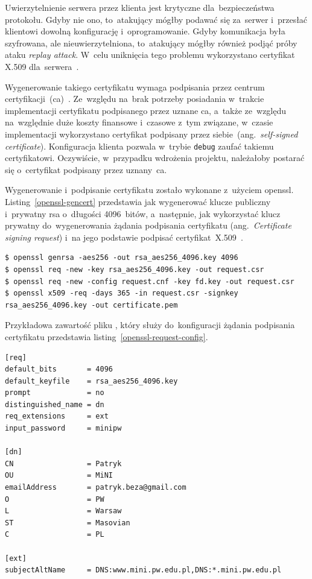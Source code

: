 \documentclass[thesis]{subfiles}
\begin{document}
Uwierzytelnienie serwera przez klienta jest krytyczne dla~bezpieczeństwa protokołu. Gdyby nie ono, to~atakujący mógłby podawać się za~serwer i~przesłać klientowi dowolną konfigurację i~oprogramowanie. Gdyby komunikacja była szyfrowana, ale nieuwierzytelniona, to~atakujący mógłby również podjąć próby ataku \emph{replay attack}. W~celu uniknięcia tego problemu wykorzystano certyfikat X.509 dla~serwera~\cite{wiki:x509}.

Wygenerowanie takiego certyfikatu wymaga podpisania przez centrum certyfikacji~(\gls{ca})~\cite{wiki:ca}. Ze~względu na~brak potrzeby posiadania w~trakcie implementacji certyfikatu podpisanego przez uznane \gls{ca}, a~także ze~względu na~względnie duże koszty finansowe i~czasowe z~tym związane, w~czasie implementacji wykorzystano certyfikat podpisany przez siebie~(ang.~\emph{self-signed certificate}). Konfiguracja klienta pozwala w~trybie \texttt{debug} zaufać takiemu certyfikatowi. Oczywiście, w~przypadku wdrożenia projektu, należałoby postarać się o~certyfikat podpisany przez uznany~\gls{ca}.

Wygenerowanie i~podpisanie certyfikatu zostało wykonane z~użyciem \gls{openssl}. Listing~\ref{openssl-gencert} przedstawia jak wygenerować klucze publiczny i~prywatny \gls{rsa} o~długości 4096~bitów, a~następnie, jak wykorzystać klucz prywatny do~wygenerowania żądania podpisania certyfikatu (ang.~\emph{Certificate signing request}) i~na jego podstawie podpisać certyfikat~X.509~\cite{openssl-cookbook,wiki:csr}.

\begin{lstlisting}[numbers=none,caption={Wygenerowanie i~podpisanie certyfikatu X.509},label=openssl-gencert]
$ openssl genrsa -aes256 -out rsa_aes256_4096.key 4096
$ openssl req -new -key rsa_aes256_4096.key -out request.csr
$ openssl req -new -config request.cnf -key fd.key -out request.csr
$ openssl x509 -req -days 365 -in request.csr -signkey rsa_aes256_4096.key -out certificate.pem
\end{lstlisting}

Przykładowa zawartość pliku , który służy do~konfiguracji żądania podpisania certyfikatu przedstawia listing~\ref{openssl-request-config}.

\begin{lstlisting}[numbers=none,caption={Plik z~konfiguracją certyfikatu X.509},label=openssl-request-config]
[req]
default_bits       = 4096
default_keyfile    = rsa_aes256_4096.key
prompt             = no
distinguished_name = dn
req_extensions     = ext
input_password     = minipw

[dn]
CN                 = Patryk
OU                 = MiNI
emailAddress       = patryk.beza@gmail.com
O                  = PW
L                  = Warsaw
ST                 = Masovian
C                  = PL

[ext]
subjectAltName     = DNS:www.mini.pw.edu.pl,DNS:*.mini.pw.edu.pl
\end{lstlisting}
\end{document}
